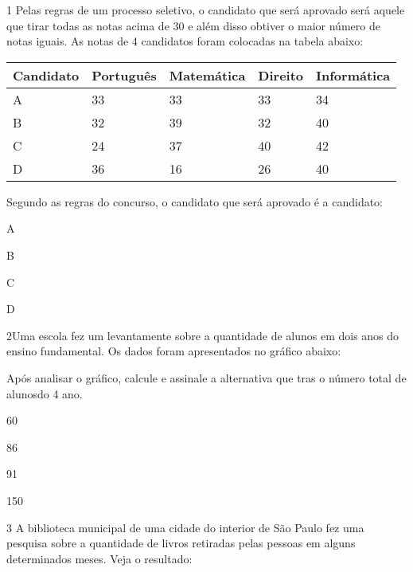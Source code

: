 \num{1} Pelas regras de um processo seletivo, o candidato que será aprovado
será aquele que tirar todas as notas acima de 30 e além disso obtiver o
maior número de notas iguais. As notas de 4 candidatos foram colocadas
na tabela abaixo:

\begin{longtable}[]{@{}lllll@{}}
\toprule
Candidato & Português & Matemática & Direito &
Informática\tabularnewline
\midrule
\endhead
A & 33 & 33 & 33 & 34\tabularnewline
B & 32 & 39 & 32 & 40\tabularnewline
C & 24 & 37 & 40 & 42\tabularnewline
D & 36 & 16 & 26 & 40\tabularnewline
\bottomrule
\end{longtable}

Segundo as regras do concurso, o candidato que será aprovado é a
candidato:

\begin{escolha}
\item
  A
\item
  B
\item
  C
\item
  D
\end{escolha}


\num{2}Uma escola fez um levantamente sobre a quantidade de alunos em dois
anos do ensino fundamental. Os dados foram apresentados no gráfico
abaixo:


Após analisar o gráfico, calcule e assinale a alternativa que tras o
número total de alunosdo 4 ano.

\begin{escolha}
\item
  60
\item
  86
\item
  91
\item
  150
\end{escolha}


\num{3} A biblioteca municipal de uma cidade do interior de São Paulo fez
uma pesquisa sobre a quantidade de livros retiradas pelas pessoas em
alguns determinados meses. Veja o resultado:

